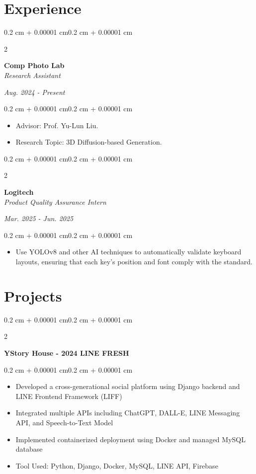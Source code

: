 \documentclass[10pt, letterpaper]{article}
\newenvironment{highlights}{
    \begin{itemize}[
        topsep=0.05 cm,
        parsep=0.05 cm,
        partopsep=0pt,
        itemsep=0pt,
        leftmargin=0.4 cm + 10pt
    ]
}{
    \end{itemize}
}
\newenvironment{onecolentry}{
    \begin{adjustwidth}{0.2 cm + 0.00001 cm}{0.2 cm + 0.00001 cm}
}{
    \end{adjustwidth}
}
\newenvironment{twocolentry}[2][]{
    \onecolentry
    \def\secondColumn{#2}
    \setcolumnwidth{\fill, 4.5 cm}
    \begin{paracol}{2}
}{
    \switchcolumn \raggedleft \secondColumn
    \end{paracol}
    \endonecolentry
}
\let\hrefWithoutArrow\href
\renewcommand{\href}[2]{\hrefWithoutArrow{#1}{\ifthenelse{\equal{#2}{}}{ }{#2 }\raisebox{.15ex}{\footnotesize \faExternalLink*}}}
\begin{document}
    \section{Experience}
        \begin{twocolentry}{
        \textit{Aug. 2024 - Present}}
            \textbf{Comp Photo Lab} \\
            \textit{Research Assistant}
        \end{twocolentry}
        \begin{onecolentry}
            \begin{highlights}
                \item Advisor: Prof. Yu-Lun Liu. 
                \item Research Topic: 3D Diffusion-based Generation.
            \end{highlights}
        \end{onecolentry}

        \vspace{0.10 cm}
        \begin{twocolentry}{
            \textit{Mar. 2025 - Jun. 2025}}
                \textbf{Logitech} \\
                \textit{Product Quality Assurance Intern}
        \end{twocolentry}
        \begin{onecolentry}
            \begin{highlights}
                \item Use YOLOv8 and other AI techniques to automatically validate keyboard layouts, ensuring that each key's position and font comply with the standard.
            \end{highlights}
        \end{onecolentry}

    \section{Projects}

        \begin{twocolentry}{
        \textit{\href{https://github.com/ChuEating1005/2024-LINE-FRESH}{Link}}}
            \textbf{YStory House - 2024 LINE FRESH} 
        \end{twocolentry}
        \vspace{0.05 cm}
        \begin{onecolentry}
            \begin{highlights}
                \item Developed a cross-generational social platform using Django backend and LINE Frontend Framework (LIFF)
                \item Integrated multiple APIs including ChatGPT, DALL-E, LINE Messaging API, and Speech-to-Text Model
                \item Implemented containerized deployment using Docker and managed MySQL database
                \item Tool Used: Python, Django, Docker, MySQL, LINE API, Firebase
            \end{highlights}
        \end{onecolentry}
        
\end{document}
